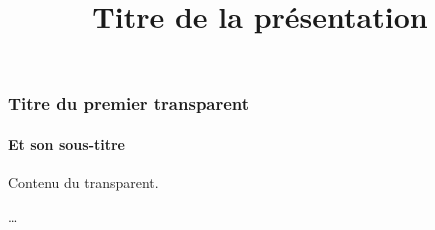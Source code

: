  

 
\title{Titre de la présentation}
\maketitle
 
\begin{frame} %
\frametitle{Titre du premier transparent}
\framesubtitle{Et son sous-titre}
 
Contenu du transparent.
 
\end{frame}
 
\begin{frame} %
…
\end{frame}
 
